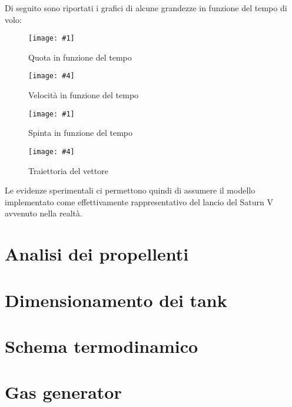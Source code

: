 \documentclass[11pt,a4paper]{article}
\newcommand{\twofig}[6]{
\begin{figure}[H]
	\begin{minipage}{0.48\linewidth}
		\centering
		\texttt{[image: \#1]}
		\caption{#2}
		\label{fig:#3}
	\end{minipage}\hfill
	\begin{minipage}{0.48\linewidth}
		\centering
		\texttt{[image: \#4]}
		\caption{#5}
		\label{fig:#6}
	\end{minipage}
\end{figure}
}
\begin{document}
Di seguito sono riportati i grafici di alcune grandezze in funzione del tempo di volo:


\twofig{01_quota_t}{Quota in funzione del tempo}{quota_t}{02_velocita_t}{Velocità in funzione del tempo}{velocita_t}

\twofig{04_spinta_t}{Spinta in funzione del tempo}{spinta_t}{07_traiettoria}{Traiettoria del vettore}{traiettoria}

Le evidenze sperimentali ci permettono quindi di assumere il modello implementato come effettivamente rappresentativo del lancio del Saturn V avvenuto nella realtà.




\section{Analisi dei propellenti}

\label{sec:analisi propellenti}




\section{Dimensionamento dei tank}

\label{sec:dimensionamento tank}




\section{Schema termodinamico}

\label{sec:schema termodinamico}




\section{Gas generator}
\end{document}
